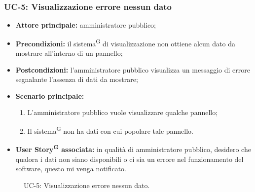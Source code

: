 \documentclass[8pt]{article}
\newcommand{\glossterm}[1]{#1\textsuperscript{G}} %
\begin{document}
\subsubsection*{UC-5: Visualizzazione errore nessun dato}
\begin{itemize}
    \item \textbf{Attore principale:} amministratore pubblico;
    \item \textbf{Precondizioni:} il \glossterm{sistema} di visualizzazione non ottiene alcun dato da mostrare all’interno di un pannello;
    \item \textbf{Postcondizioni:} l’amministratore pubblico visualizza un messaggio di errore segnalante l’assenza di dati da mostrare;
    \item \textbf{Scenario principale:}
        \begin{enumerate}
        \item L’amministratore pubblico vuole visualizzare qualche pannello;
        \item Il \glossterm{sistema} non ha dati con cui popolare tale pannello.
        \end{enumerate}
    \item \textbf{\glossterm{User Story} associata:} in qualità di amministratore pubblico, desidero che qualora i dati non siano disponibili o ci sia un errore nel funzionamento del software, questo mi venga notificato.
\end{itemize}
\begin{figure}[ht!]
    \centering
    \caption{UC-5: Visualizzazione errore nessun dato.}
    \label{fig:UC-5: Visualizzazione errore nessun dato}
\end{figure}
\end{document}
